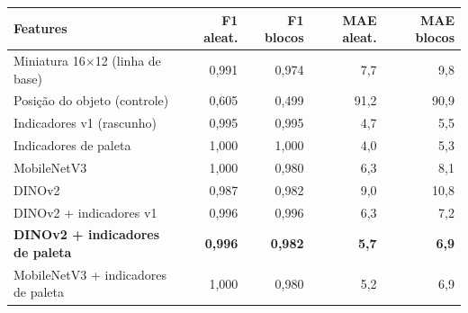 \begin{tabular}{lrrrr}
\toprule
Features & F1 aleat. & F1 blocos & MAE aleat. & MAE blocos \\
\midrule
Miniatura 16$\times$12 (linha de base) & 0,991 & 0,974 & 7,7 & 9,8 \\
Posição do objeto (controle) & 0,605 & 0,499 & 91,2 & 90,9 \\
Indicadores v1 (rascunho) & 0,995 & 0,995 & 4,7 & 5,5 \\
Indicadores de paleta & 1,000 & 1,000 & 4,0 & 5,3 \\
MobileNetV3 & 1,000 & 0,980 & 6,3 & 8,1 \\
DINOv2 & 0,987 & 0,982 & 9,0 & 10,8 \\
DINOv2 + indicadores v1 & 0,996 & 0,996 & 6,3 & 7,2 \\
\textbf{DINOv2 + indicadores de paleta} & \textbf{0,996} & \textbf{0,982} & \textbf{5,7} & \textbf{6,9} \\
MobileNetV3 + indicadores de paleta & 1,000 & 0,980 & 5,2 & 6,9 \\
\bottomrule
\end{tabular}
